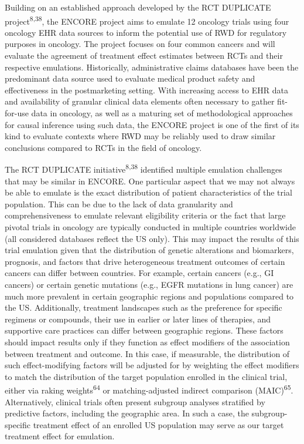 \documentclass[
  letterpaper,
  DIV=11,
  numbers=noendperiod]{scrartcl}
\begin{document}
Building on an established approach developed by the RCT DUPLICATE
project\textsuperscript{8,38}, the ENCORE project aims to emulate 12
oncology trials using four oncology EHR data sources to inform the
potential use of RWD for regulatory purposes in oncology. The project
focuses on four common cancers and will evaluate the agreement of
treatment effect estimates between RCTs and their respective emulations.
Historically, administrative claims databases have been the predominant
data source used to evaluate medical product safety and effectiveness in
the postmarketing setting. With increasing access to EHR data and
availability of granular clinical data elements often necessary to
gather fit-for-use data in oncology, as well as a maturing set of
methodological approaches for causal inference using such data, the
ENCORE project is one of the first of its kind to evaluate contexts
where RWD may be reliably used to draw similar conclusions compared to
RCTs in the field of oncology.

The RCT DUPLICATE initiative\textsuperscript{8,38} identified multiple
emulation challenges that may be similar in ENCORE. One particular
aspect that we may not always be able to emulate is the exact
distribution of patient characteristics of the trial population. This
can be due to the lack of data granularity and comprehensiveness to
emulate relevant eligibility criteria or the fact that large pivotal
trials in oncology are typically conducted in multiple countries
worldwide (all considered databases reflect the US only). This may
impact the results of this trial emulation given that the distribution
of genetic alterations and biomarkers, prognosis, and factors that drive
heterogeneous treatment outcomes of certain cancers can differ between
countries. For example, certain cancers (e.g., GI cancers) or certain
genetic mutations (e.g., EGFR mutations in lung cancer) are much more
prevalent in certain geographic regions and populations compared to the
US. Additionally, treatment landscapes such as the preference for
specific regimens or compounds, their use in earlier or later lines of
therapies, and supportive care practices can differ between geographic
regions. These factors should impact results only if they function as
effect modifiers of the association between treatment and outcome. In
this case, if measurable, the distribution of such effect-modifying
factors will be adjusted for by weighting the effect modifiers to match
the distribution of the target population enrolled in the clinical
trial, either via raking weights\textsuperscript{64} or
matching-adjusted indirect comparison (MAIC)\textsuperscript{65}.
Alternatively, clinical trials often present subgroup analyses
stratified by predictive factors, including the geographic area. In such
a case, the subgroup-specific treatment effect of an enrolled US
population may serve as our target treatment effect for emulation.
\end{document}

